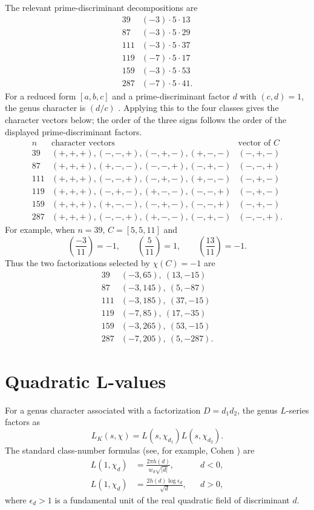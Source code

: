 \documentclass[11pt,a4paper]{article}
\begin{document}
The relevant prime-discriminant decompositions are
\[
\begin{array}{c|c}
39&(-3)\cdot5\cdot13\\
87&(-3)\cdot5\cdot29\\
111&(-3)\cdot5\cdot37\\
119&(-7)\cdot5\cdot17\\
159&(-3)\cdot5\cdot53\\
287&(-7)\cdot5\cdot41.
\end{array}
\]
For a reduced form $[a,b,c]$ and a prime-discriminant factor $d$ with $(c,d)=1$, the genus character is $(d/c)$ \cite{BCZ1997}.  Applying this to the four classes gives the character vectors below; the order of the three signs follows the order of the displayed prime-discriminant factors.
\[
\begin{array}{c|c|c}
 n&\text{character vectors}&\text{vector of }C\\ \hline
39&(+,+,+),(-,-,+),(-,+,-),(+,-,-)&(-,+,-)\\
87&(+,+,+),(+,-,-),(-,-,+),(-,+,-)&(-,-,+)\\
111&(+,+,+),(-,-,+),(-,+,-),(+,-,-)&(-,+,-)\\
119&(+,+,+),(-,+,-),(+,-,-),(-,-,+)&(-,+,-)\\
159&(+,+,+),(+,-,-),(-,+,-),(-,-,+)&(-,+,-)\\
287&(+,+,+),(-,-,+),(+,-,-),(-,+,-)&(-,-,+).
\end{array}
\]
For example, when $n=39$, $C=[5,5,11]$ and
\[
\left(\frac{-3}{11}\right)=-1,
\qquad
\left(\frac5{11}\right)=1,
\qquad
\left(\frac{13}{11}\right)=-1.
\]
Thus the two factorizations selected by $\chi(C)=-1$ are
\[
\begin{array}{c|c}
39&(-3,65),\ (13,-15)\\
87&(-3,145),\ (5,-87)\\
111&(-3,185),\ (37,-15)\\
119&(-7,85),\ (17,-35)\\
159&(-3,265),\ (53,-15)\\
287&(-7,205),\ (5,-287).
\end{array}
\]

\section{Quadratic L-values}
For a genus character associated with a factorization $D=d_1d_2$, the genus $L$-series factors as \cite{BCZ1997}
\begin{equation}
L_K(s,\chi)=L(s,\chi_{d_1})L(s,\chi_{d_2}).
\label{eq:Lfactor}
\end{equation}
The standard class-number formulas (see, for example, Cohen \cite{Cohen1993}) are
\begin{align}
L(1,\chi_d)&=\frac{2\pi h(d)}{w_d\sqrt{|d|}},&&d<0,\label{eq:Lneg}\\
L(1,\chi_d)&=\frac{2h(d)\log\epsilon_d}{\sqrt d},&&d>0,
\label{eq:Lpos}
\end{align}
where $\epsilon_d>1$ is a fundamental unit of the real quadratic field of discriminant $d$.
\end{document}
